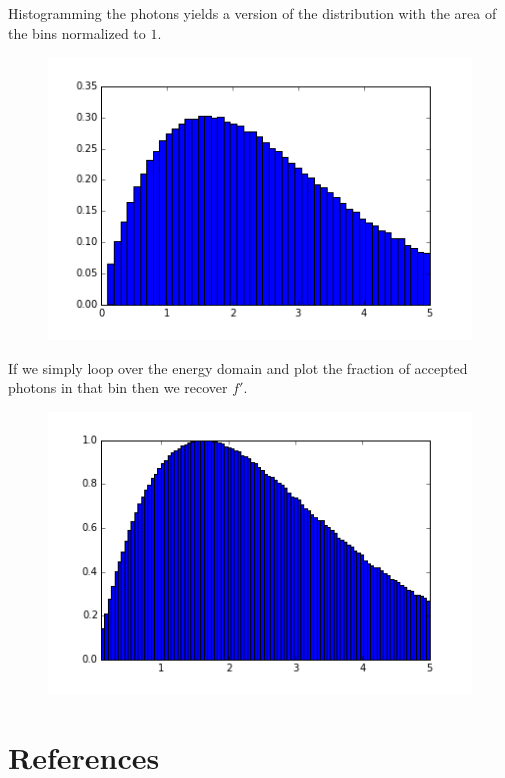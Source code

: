 \documentclass[12pt,a4paper]{article}
\begin{document}
\subsection{}
Histogramming the photons yields a version of the distribution
with the area of the bins normalized to $1$.
\begin{figure}[!h]
  \includegraphics[]{HW1_3_6_normalized.png}
\end{figure}
\newpage
\noindent
If we simply loop over the energy domain and plot the fraction of accepted
photons in that bin then we recover $f'$.
\begin{figure}[!h]
  \includegraphics[]{HW1_3_6.png}
\end{figure}

\newpage

\section*{References}
\end{document}
